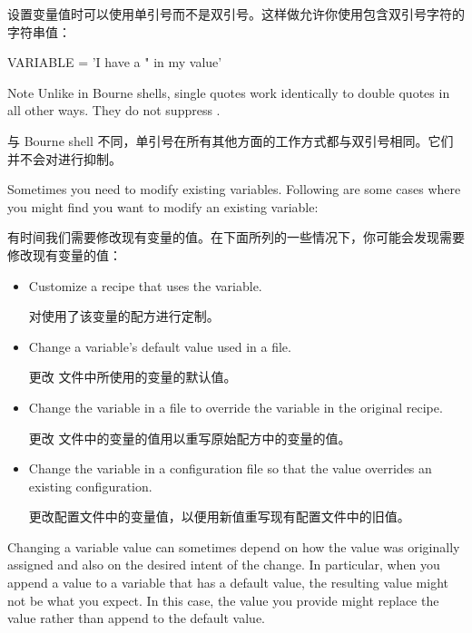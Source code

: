 设置变量值时可以使用单引号而不是双引号。这样做允许你使用包含双引号字符的字符串值：

\begin{pyglist}
VARIABLE = 'I have a " in my value'
\end{pyglist}

\begin{noteblock}{Note}%
Unlike in Bourne shells, single quotes work identically to double quotes in all other ways. They do not suppress .

\medskip
与 Bourne shell 不同，单引号在所有其他方面的工作方式都与双引号相同。它们并不会对进行抑制。
\end{noteblock}


Sometimes you need to modify existing variables. Following are some cases where you might find you want to modify an existing variable:

有时间我们需要修改现有变量的值。在下面所列的一些情况下，你可能会发现需要修改现有变量的值：

\begin{itemize}
\setlength\itemsep{1.0em}
\item Customize a recipe that uses the variable.

\medskip
对使用了该变量的配方进行定制。

\item Change a variable's default value used in a  file.

\medskip
更改  文件中所使用的变量的默认值。

\item Change the variable in a  file to override the variable in the original recipe.

\medskip
更改  文件中的变量的值用以重写原始配方中的变量的值。

\item Change the variable in a configuration file so that the value overrides an existing configuration.

\medskip
更改配置文件中的变量值，以便用新值重写现有配置文件中的旧值。
\end{itemize}

Changing a variable value can sometimes depend on how the value was originally assigned and also on the desired intent of the change. In particular, when you append a value to a variable that has a default value, the resulting value might not be what you expect. In this case, the value you provide might replace the value rather than append to the default value.

